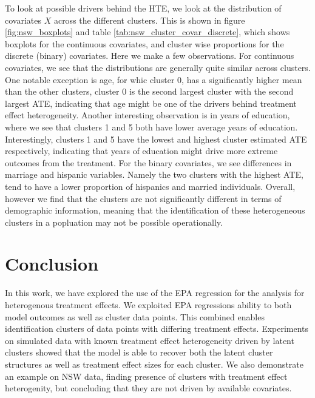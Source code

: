 \documentclass{article}
\begin{document}
To look at possible drivers behind the HTE, we look at the distribution of covariates $X$ across the different clusters. This is shown in figure \ref{fig:nsw_boxplots} and table \ref{tab:nsw_cluster_covar_discrete}, which shows boxplots for the continuous covariates, and cluster wise proportions for the discrete (binary) covariates. Here we make a few observations. For continuous covariates, we see that the distributions are generally quite similar across clusters. One notable exception is age, for whic cluster 0, has a significantly higher mean than the other clusters, cluster 0 is the second largest cluster with the second largest ATE, indicating that age might be one of the drivers behind treatment effect heterogeneity. Another interesting observation is in years of education, where we see that clusters 1 and 5 both have lower average years of education. Interestingly, clusters 1 and 5 have the lowest and highest cluster estimated ATE respectively, indicating that years of education might drive more extreme outcomes from the treatment. For the binary covariates, we see differences in marriage and hispanic variables. Namely the two clusters with the highest ATE, tend to have a lower proportion of hispanics and married individuals. Overall, however we find that the clusters are not significantly different in terms of demographic information, meaning that the identification of these heterogeneous clusters in a popluation may not be possible operationally.

\section{Conclusion}
In this work, we have explored the use of the EPA regression for the analysis for heterogenous treatment effects. We exploited EPA regressions ability to both model outcomes as well as cluster data points. This combined enables identification clusters of data points with differing treatment effects. Experiments on simulated data with known treatment effect heterogeneity driven by latent clusters showed that the model is able to recover both the latent cluster structures as well as treatment effect sizes for each cluster. We also demonstrate an example on NSW data, finding presence of clusters with treatment effect heterogenity, but concluding that they are not driven by available covariates.

\printbibliography
\end{document}

